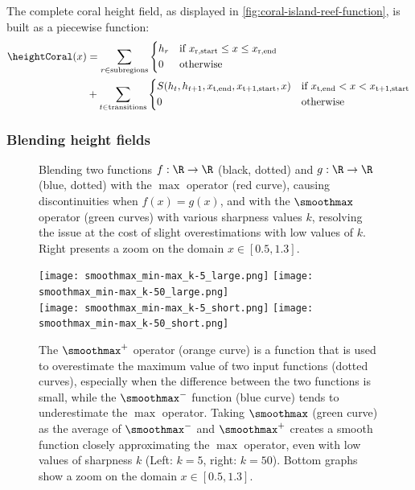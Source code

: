 The complete coral height field, as displayed in \cref{fig:coral-island-reef-function}, is built as a piecewise function:
\begin{align}
    \label{eq:coral-island-full-reef-function}
    \heightCoral(x) &= \sum_{r \in \text{subregions}}{
    \begin{dcases}
        h_r & \text{if } x_{\text{r,start}} \leq x \leq x_{\text{r,end}} \\
        0 & \text{otherwise}
    \end{dcases}
    } \nonumber \\
    &+
    \sum_{t \in \text{transitions}} {
    \begin{dcases}
        S(h_{t}, h_{t+1}, x_{\text{t,end}}, x_{\text{t+1,start}}, x) & \text{if } x_{\text{t,end}} < x < x_{\text{t+1,start}} \\
        0 & \text{otherwise}
    \end{dcases}
    }
\end{align}

\subsubsection{Blending height fields}
\label{subsubsec:height-functions-blending}

\begin{figure}[H]
    \caption[Effect of $k$ on the $\smoothmax$ operator]{Blending two functions $f: \R \to \R$ (black, dotted) and $g: \R \to \R$ (blue, dotted) with the $\max$ operator (red curve), causing discontinuities when $f(x)=g(x)$, and with the $\smoothmax$ operator (green curves) with various sharpness values $k$, resolving the issue at the cost of slight overestimations with low values of $k$. Right presents a zoom on the domain $x \in [0.5, 1.3]$. }
    \label{fig:coral-island-blend-function-island}
\end{figure}

\begin{figure}[H]
    \texttt{[image: smoothmax\_min-max\_k-5\_large.png]}
    \texttt{[image: smoothmax\_min-max\_k-50\_large.png]} \\
    \texttt{[image: smoothmax\_min-max\_k-5\_short.png]}
    \texttt{[image: smoothmax\_min-max\_k-50\_short.png]}
    \caption[Definition of $\smoothmax$ as the average of $\smoothmax^+$ and $\smoothmax^-$]{The $\smoothmax^+$ operator (orange curve) is a function that is used to overestimate the maximum value of two input functions (dotted curves), especially when the difference between the two functions is small, while the $\smoothmax^-$ function (blue curve) tends to underestimate the $\max$ operator. Taking $\smoothmax$ (green curve) as the average of $\smoothmax^-$ and $\smoothmax^+$ creates a smooth function closely approximating the $\max$ operator, even with low values of sharpness $k$ (Left: $k=5$, right: $k=50$). Bottom graphs show a zoom on the domain $x \in [0.5, 1.3]$.}
    \label{fig:coral-island-blend-function-island-with-upper}
\end{figure}


